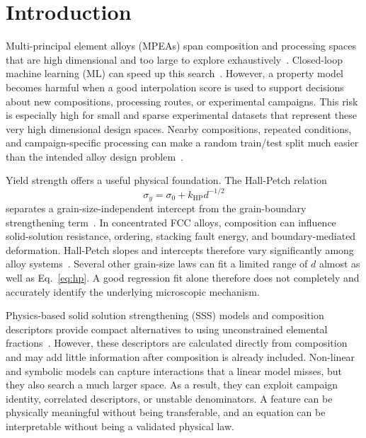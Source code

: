 \documentclass[5p,times,twocolumn]{elsarticle}
\begin{document}
\section{Introduction}
\label{sec:intro}

Multi-principal element alloys (MPEAs) span composition and processing spaces that are high dimensional and too large to explore exhaustively~\cite{Cantor2004,Yeh2004,George2019,Miracle2017}. Closed-loop machine learning (ML) can speed up this search~\cite{Rao2022,Hastings2025FCC,Mulukutla2024BIRDSHOT,Mulukutla2026BRAVE}. However, a property model becomes harmful when a good interpolation score is used to support decisions about new compositions, processing routes, or experimental campaigns. This risk is especially high for small and sparse experimental datasets that represent these very high dimensional design spaces. Nearby compositions, repeated conditions, and campaign-specific processing can make a random train/test split much easier than the intended alloy design problem~\cite{Meredig2018,WangAYT2020,LiMDHIT2024}.

Yield strength offers a useful physical foundation. The Hall-Petch relation
\begin{equation}
\sigma_y=\sigma_0+k_{\mathrm{HP}}d^{-1/2}
\label{eq:hp}
\end{equation}
separates a grain-size-independent intercept from the grain-boundary strengthening term~\cite{Hall1951,Petch1953,Cordero2016}. In concentrated FCC alloys, composition can influence solid-solution resistance, ordering, stacking fault energy, and boundary-mediated deformation. Hall-Petch slopes and intercepts therefore vary significantly among alloy systems~\cite{Otto2013,Yoshida2017,LiKHP2024}. Several other grain-size laws can fit a limited range of $d$ almost as well as Eq.~\eqref{eq:hp}. A good regression fit alone therefore does not completely and accurately identify the underlying microscopic mechanism.

Physics-based solid solution strengthening (SSS) models and composition descriptors provide compact alternatives to using unconstrained elemental fractions~\cite{Varvenne2016,Varvenne2017,Labusch1970,TodaCaraballo2015,Wen2021SSS}. However, these descriptors are calculated directly from composition and may add little information after composition is already included. Non-linear and symbolic models can capture interactions that a linear model misses, but they also search a much larger space. As a result, they can exploit campaign identity, correlated descriptors, or unstable denominators. A feature can be physically meaningful without being transferable, and an equation can be interpretable without being a validated physical law.
\end{document}
